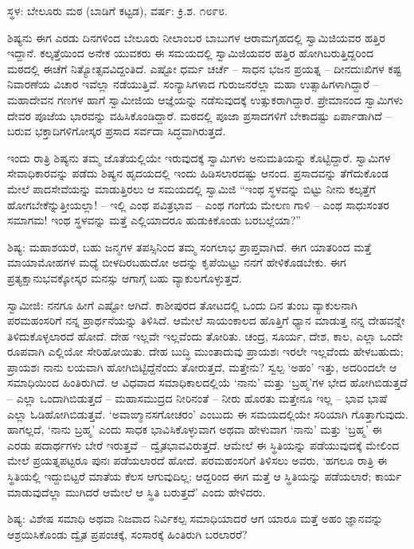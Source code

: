 \centerline{ಸ್ಥಳ: ಬೇಲೂರು ಮಠ (ಬಾಡಿಗೆ ಕಟ್ಟಡ), ವರ್ಷ: ಕ್ರಿ.ಶ. ೧೮೯೮.}

ಶಿಷ್ಯನು ಈಗ ಎರಡು ದಿನಗಳಿಂದ ಬೇಲೂರು ನೀಲಾಂಬರ ಬಾಬುಗಳ ಆರಾಮಗೃಹದಲ್ಲಿ ಸ್ವಾಮಿಜಿಯವರ ಹತ್ತಿರ ಇದ್ದಾನೆ. ಕಲ್ಕತ್ತೆಯಿಂದ ಅನೇಕ ಯುವಕರು ಈ ಸಮಯದಲ್ಲಿ ಸ್ವಾಮಿಜಿಯವರ ಹತ್ತಿರ ಹೋಗಿಬರುತ್ತಿದ್ದರಿಂದ ಮಠದಲ್ಲಿ ಈಚೆಗೆ ನಿತ್ಯೋತ್ಸವವಿದ್ದಂತಿದೆ. ಎಷ್ಟೋ ಧರ್ಮ ಚರ್ಚೆ – ಸಾಧನ ಭಜನ ಪ್ರಯತ್ನ – ದೀನದುಃಖಿಗಳ ಕಷ್ಟ ನಿವಾರಣೆಯ ವಿಚಾರ ಇವೆಲ್ಲಾ ನಡೆಯುತ್ತಿವೆ. ಸಂನ್ಯಾಸಿಗಳಾದ ಗುರುಜನರೆಲ್ಲಾ ಮಹಾ ಉತ್ಸಾಹಿಗಳಾಗಿದ್ದಾರೆ – ಮಹಾದೇವನ ಗಣಗಳ ಹಾಗೆ ಸ್ವಾಮೀಜಿಯ ಆಜ್ಞೆಯನ್ನು ನಡೆಸುವುದಕ್ಕೆ ಉತ್ಸುಕರಾಗಿದ್ದಾರೆ. ಪ್ರೇಮಾನಂದ ಸ್ವಾಮಿಗಳು ದೇವರ ಪೂಜೆಯ ಭಾರವನ್ನು ವಹಿಸಿಕೊಂಡಿದ್ದಾರೆ. ಮಠದಲ್ಲಿ ಪೂಜಾ ಪ್ರಸಾದಗಳಿಗೆ ಬೇಕಾದಷ್ಟು ಏರ್ಪಾಡಾಗಿದೆ – ಬರುವ ಭಕ್ತಾದಿಗಳಿಗೋಸ್ಕರ ಪ್ರಸಾದ ಸರ್ವದಾ ಸಿದ್ಧವಾಗಿರುತ್ತದೆ.

ಇಂದು ರಾತ್ರಿ ಶಿಷ್ಯನು ತಮ್ಮ ಜೊತೆಯಲ್ಲಿಯೇ ಇರುವುದಕ್ಕೆ ಸ್ವಾಮಿಗಳು ಅನುಮತಿಯನ್ನು ಕೊಟ್ಟಿದ್ದಾರೆ. ಸ್ವಾಮಿಗಳ ಸೇವಾಧಿಕಾರವನ್ನು ಪಡೆದು ಶಿಷ್ಯನ ಹೃದಯದಲ್ಲಿ ಇಂದು ಹಿಡಿಸಲಾರದಷ್ಟು ಆನಂದ. ಪ್ರಸಾದವನ್ನು ತೆಗೆದುಕೊಂಡ ಮೇಲೆ ಪಾದಸೇವೆಯನ್ನು ಮಾಡುತ್ತಿರಲು ಆ ಸಮಯದಲ್ಲಿ ಸ್ವಾಮಿಜಿ “ಇಂಥ ಸ್ಥಳವನ್ನು ಬಿಟ್ಟು ನೀನು ಕಲ್ಕತ್ತೆಗೆ ಹೋಗಬೇಕೆನ್ನುತ್ತೀಯಲ್ಲಾ! – ಇಲ್ಲಿ ಎಂಥ ಪವಿತ್ರಭಾವ – ಎಂಥ ಗಂಗೆಯ ಮೇಲಣ ಗಾಳಿ – ಎಂಥ ಸಾಧುಸಂತರ ಸಮಾಗಮ! ಇಂಥ ಸ್ಥಳವನ್ನು ಮತ್ತೆ ಎಲ್ಲಿಯಾದರೂ ಹುಡುಕಿಕೊಂಡು ಬರಬಲ್ಲೆಯಾ?”

ಶಿಷ್ಯ: ಮಹಾಶಯರೆ, ಬಹು ಜನ್ಮಗಳ ತಪಸ್ಸಿನಿಂದ ತಮ್ಮ ಸಂಗಲಾಭ ಪ್ರಾಪ್ತವಾಗಿದೆ. ಈಗ ಯಾತರಿಂದ ಮತ್ತೆ ಮಾಯಾಮೋಹಗಳ ಮಧ್ಯೆ ಬೀಳದಿರಬಹುದೋ ಅದನ್ನು ಕೃಪೆಯಿಟ್ಟು ನನಗೆ ಹೇಳಿಕೊಡಬೇಕು. ಈಗ ಪ್ರತ್ಯಕ್ಷಾನುಭವಕ್ಕೋಸ್ಕರ ಮನಸ್ಸು ಆಗಾಗ್ಗೆ ಬಹು ವ್ಯಾಕುಲಗೊಳ್ಳುತ್ತದೆ.

ಸ್ವಾಮೀಜಿ: ನನಗೂ ಹೀಗೆ ಎಷ್ಟೋ ಆಗಿದೆ. ಕಾಶೀಪುರದ ತೋಟದಲ್ಲಿ ಒಂದು ದಿನ ತುಂಬ ವ್ಯಾಕುಲನಾಗಿ ಪರಮಹಂಸರಿಗೆ ನನ್ನ ಪ್ರಾರ್ಥನೆಯನ್ನು ತಿಳಿಸಿದೆ. ಆಮೇಲೆ ಸಾಯಂಕಾಲದ ಹೊತ್ತಿಗೆ ಧ್ಯಾನ ಮಾಡುತ್ತ ನನ್ನ ದೇಹವನ್ನೇ ತಿಳಿದುಕೊಳ್ಳಲಾರದೆ ಹೋದೆ. ದೇಹ ಇಲ್ಲವೇ ಇಲ್ಲವೆಂದು ತೋರಿತು. ಚಂದ್ರ, ಸೂರ್ಯ, ದೇಶ, ಕಾಲ, ಎಲ್ಲಾ ಒಂದೇ ರೂಪವಾಗಿ ಎಲ್ಲಿಯೋ ಸೇರಿಹೋಯಿತು. ದೇಹ ಬುದ್ಧಿ ಮುಂತಾದುವು ಪ್ರಾಯಶಃ ಇರಲೇ ಇಲ್ಲವೆಂದು ಹೇಳಬಹುದು; ಪ್ರಾಯಶಃ ನಾನು ಲಯವಾಗಿ ಹೋಗಿಬಿಟ್ಟಿದ್ದೆನೆಂದು ತೋರುತ್ತದೆ, ಮತ್ತೇನು? ಸ್ವಲ್ಪ ‘ಅಹಂ’ ಇತ್ತು, ಅದರಿಂದಲೇ ಆ ಸಮಾಧಿಯಿಂದ ಹಿಂತಿರುಗಿದೆ. ಆ ವಿಧವಾದ ಸಮಾಧಿಕಾಲದಲ್ಲಿಯೆ ‘ನಾನು’ ಮತ್ತು ‘ಬ್ರಹ್ಮ’ಗಳ ಭೇದ ಹೋಗಿಬಿಡುತ್ತದೆ – ಎಲ್ಲಾ ಒಂದಾಗಿಬಿಡುತ್ತದೆ – ಮಹಾಸಮುದ್ರದ ನೀರಿನಂತೆ – ನೀರು ಹೊರತು ಮತ್ತೇನೂ ಇಲ್ಲ – ಭಾವ ಭಾಷೆ ಎಲ್ಲಾ ಓಡಿಹೋಗಿಬಿಡುತ್ತವೆ. ‘ಅವಾಙ್ಮಾನಸಗೋಚರಂ’ ಎಂಬುದು ಈ ಸಮಯದಲ್ಲಿಯೇ ಸರಿಯಾಗಿ ಗೊತ್ತಾಗುವುದು. ಹಾಗಲ್ಲದೆ, ‘ನಾನು ಬ್ರಹ್ಮ’ ಎಂದು ಸಾಧಕ ಭಾವಿಸಿಕೊಳ್ಳುವಾಗ ಅಥವಾ ಹೇಳುವಾಗ ‘ನಾನು’ ಮತ್ತು ‘ಬ್ರಹ್ಮ’ ಈ ಎರಡು ಪದಾರ್ಥಗಳು ಬೇರೆ ಇರುತ್ತವೆ – ದ್ವೈತಭಾವವಿರುತ್ತದೆ. ಆಮೇಲೆ ಈ ಸ್ಥಿತಿಯನ್ನು ಪಡೆಯುವುದಕ್ಕೆ ಮೇಲಿಂದ ಮೇಲೆ ಪ್ರಯತ್ನಪಟ್ಟರೂ ಪುನಃ ಪಡೆಯಲಾರದೆ ಹೋದೆ. ಪರಮಹಂಸರಿಗೆ ತಿಳಿಸಲು ಅವರು, ‘ಹಗಲೂ ರಾತ್ರಿ ಈ ಸ್ಥಿತಿಯಲ್ಲಿ ಇದ್ದುಬಿಟ್ಟರೆ ಮಾತೆಯ ಕೆಲಸ ಆಗುವುದಿಲ್ಲ; ಆದ್ದರಿಂದ ಈಗ ಮತ್ತೆ ಆ ಸ್ಥಿತಿಯನ್ನು ಪಡೆಯಲಾರೆ; ಕಾರ್ಯ ಮಾಡುವುದೆಲ್ಲಾ ಮುಗಿದರೆ ಆಮೇಲೆ ಆ ಸ್ಥಿತಿ ಬರುತ್ತದೆ’ ಎಂದು ಹೇಳಿದರು.

ಶಿಷ್ಯ: ವಿಶೇಷ ಸಮಾಧಿ ಅಥವಾ ನಿಜವಾದ ನಿರ್ವಿಕಲ್ಪ ಸಮಾಧಿಯಾದರೆ ಆಗ ಯಾರೂ ಮತ್ತೆ ಅಹಂ ಜ್ಞಾನವನ್ನು ಆಶ್ರಯಿಸಿಕೊಂಡು ದ್ವೈತ ಪ್ರಪಂಚಕ್ಕೆ, ಸಂಸಾರಕ್ಕೆ ಹಿಂತಿರುಗಿ ಬರಲಾರರೆ?

